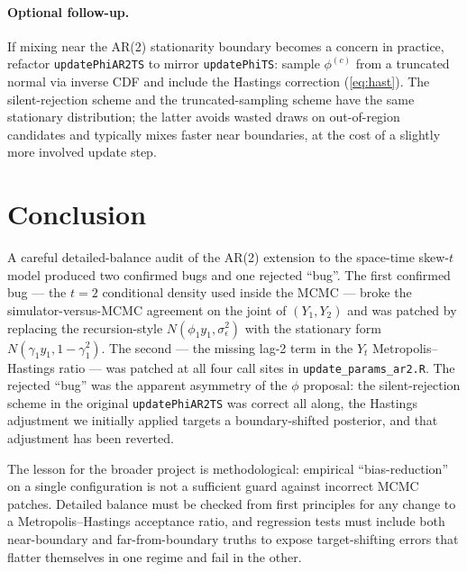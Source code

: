 \documentclass[11pt]{article}
\newcommand{\skewt}{skew-$t$\xspace}
\newcommand{\eref}[1]{(\ref{#1})}
\theoremstyle{plain}
\theoremstyle{definition}
\theoremstyle{remark}
\begin{document}
\paragraph{Optional follow-up.}
If mixing near the AR(2) stationarity boundary becomes a concern in
practice, refactor \texttt{updatePhiAR2TS} to mirror \texttt{updatePhiTS}:
sample $\phi^{(c)}$ from a truncated normal via inverse CDF and include
the Hastings correction \eref{eq:hast}. The silent-rejection scheme and
the truncated-sampling scheme have the same stationary distribution; the
latter avoids wasted draws on out-of-region candidates and typically
mixes faster near boundaries, at the cost of a slightly more involved
update step.

\section{Conclusion}\label{sec:conclusion}

A careful detailed-balance audit of the AR(2) extension to the
\citet*{morris_space-time_2017} space-time \skewt model produced two
confirmed bugs and one rejected ``bug''. The first confirmed bug --- the
$t = 2$ conditional density used inside the MCMC --- broke the
simulator-versus-MCMC agreement on the joint of $(Y_1, Y_2)$ and was
patched by replacing the recursion-style $N(\phi_1 y_1, \sigma_\epsilon^2)$
with the stationary form $N(\gamma_1 y_1, 1 - \gamma_1^2)$. The second ---
the missing lag-2 term in the $Y_t$ Metropolis--Hastings ratio --- was
patched at all four call sites in \texttt{update\_params\_ar2.R}. The
rejected ``bug'' was the apparent asymmetry of the $\phi$ proposal: the
silent-rejection scheme in the original \texttt{updatePhiAR2TS} was
correct all along, the Hastings adjustment we initially applied targets a
boundary-shifted posterior, and that adjustment has been reverted.

The lesson for the broader project is methodological: empirical
``bias-reduction'' on a single configuration is not a sufficient guard
against incorrect MCMC patches. Detailed balance must be checked from
first principles for any change to a Metropolis--Hastings acceptance
ratio, and regression tests must include both near-boundary and
far-from-boundary truths to expose target-shifting errors that flatter
themselves in one regime and fail in the other.



\end{document}
